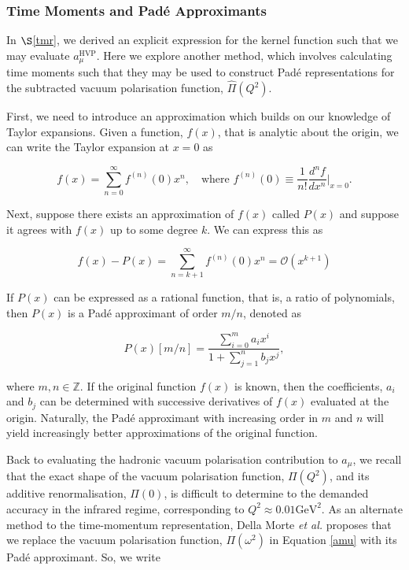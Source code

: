 \documentclass{article}
\numberwithin{equation}{section} %
\begin{document}
\subsubsection{Time Moments and Pad\'{e} Approximants}\label{moments}

In $\S$\ref{tmr}, we derived an explicit expression for the kernel function such that we may evaluate $a_\mu^{\mathrm{HVP}}$. Here we explore another method, which involves calculating time moments such that they may be used to construct Pad\'{e} representations for the subtracted vacuum polarisation function, $\hat{\Pi}(Q^2)$\cite{dellamorte}.

First, we need to introduce an approximation which builds on our knowledge of Taylor expansions. Given a function, $f(x)$, that is analytic about the origin, we can write the Taylor expansion at $x=0$ as

\begin{equation}
f(x) = \sum_{n=0}^\infty f^{(n)}(0)x^n, \quad \mathrm{where}\,\, f^{(n)}(0) \equiv \frac{1}{n!}\frac{d^nf}{dx^n}\bigg\vert_{x=0}.
\end{equation}

Next, suppose there exists an approximation of $f(x)$ called $P(x)$ and suppose it agrees with $f(x)$ up to some degree $k$\cite{pade}. We can express this as 

\begin{equation}
f(x) - P(x) = \sum_{n=k+1}^\infty f^{(n)}(0)x^n = \mathcal{O}(x^{k+1})
\end{equation}

If $P(x)$ can be expressed as a rational function, that is, a ratio of polynomials, then $P(x)$ is a Pad\'{e} approximant of order $m/n$\cite{pade}, denoted as 

\begin{equation}
P(x)[m/n] = \frac{\sum_{i=0}^ma_ix^i}{1+\sum_{j=1}^nb_jx^j},
\label{pade}
\end{equation}

\noindent where $m,n\in \mathbb{Z}$. If the original function $f(x)$ is known, then the coefficients, $a_i$ and $b_j$ can be determined with successive derivatives of $f(x)$ evaluated at the origin. Naturally, the Pad\'{e} approximant with increasing order in $m$ and $n$ will yield increasingly better approximations of the original function.

Back to evaluating the hadronic vacuum polarisation contribution to $a_\mu$, we recall that the exact shape of the vacuum polarisation function, $\Pi(Q^2)$, and its additive renormalisation, $\Pi(0)$, is difficult to determine to the demanded accuracy in the infrared regime, corresponding to $Q^2 \approx 0.01\mathrm{GeV}^2$\cite{dellamorte}. As an alternate method to the time-momentum representation, Della Morte \textit{et al.}\cite{dellamorte} proposes that we replace the vacuum polarisation function, $\Pi(\omega^2)$ in Equation \ref{amu} with its Pad\'{e} approximant. So, we write
\end{document}
